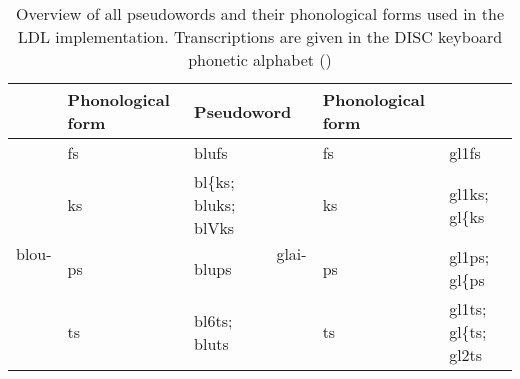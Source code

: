 \begin{table}[H]\fontsize{9}{10}
\caption{Overview of all pseudowords and their phonological forms used in the LDL implementation. Transcriptions are given in the DISC keyboard phonetic alphabet (\cite{Burnage1988})}
\label{tab:5.1}
\centering
\begin{tabular}{llllll} 
\lsptoprule
\multicolumn{2}{l}{Pseudoword}                                                          & Phonological form                                                                                     & \multicolumn{2}{l}{Pseudoword}                                                        & Phonological form                                                                                     \\ 
\midrule%
\multirow{4}{*}{blou-} & fs                                                             & blufs                                                                                                 & \multirow{4}{*}{glai-} & fs                                                           & gl1fs                                                                                                 \\
                       & ks                                                             & bl\{ks;
  bluks; blVks                                                                                &                        & ks                                                           & gl1ks;
  gl\{ks                                                                                       \\
                       & ps                                                             & blups                                                                                                 &                        & ps                                                           & gl1ps;
  gl\{ps                                                                                       \\
                       & ts                                                             & bl6ts;
  bluts                                                                                        &                        & ts                                                           & gl1ts;
  gl\{ts; gl2ts                                                                                \\ 
\midrule%

\end{tabular}
\end{table}
